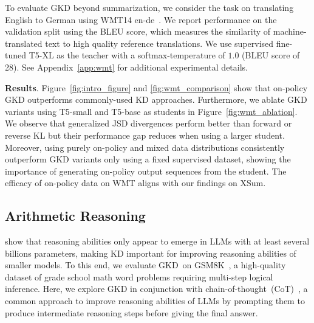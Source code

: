 \documentclass{article} %
\def\alg{GKD}
\newcommand{\nino}[1]{{\color{blue}[nino: #1]}}
\begin{document}
To evaluate GKD beyond summarization, we consider the task on translating English to  German using WMT14 en-de~\citep{bojar2014findings}. %
We report performance on the validation split using the BLEU score, which measures the similarity of machine-translated text to high quality reference translations. We use supervised fine-tuned T5-XL as the teacher with a softmax-temperature of $1.0$ (BLEU score of 28). See Appendix~\ref{app:wmt} for additional experimental details. 

\textbf{Results}. Figure~\ref{fig:intro_figure} and \ref{fig:wmt_comparison} show that on-policy GKD outperforms commonly-used KD approaches. Furthermore, we ablate GKD variants using T5-small and T5-base as students in  Figure~\ref{fig:wmt_ablation}. We observe that generalized JSD divergences perform better than forward or reverse KL but their performance gap reduces when using a larger student. Moreover, using purely on-policy and mixed data distributions consistently outperform GKD variants only using a fixed supervised dataset, showing the importance of generating on-policy output sequences from the student. The efficacy of on-policy data on WMT aligns with our findings on XSum. 









\vspace{-0.15cm}
\subsection{Arithmetic Reasoning}
\vspace{-0.1cm}

\citet{wei2022chain} show that reasoning abilities only appear to emerge in LLMs with at least several billions parameters, making KD important for improving reasoning abilities of smaller models. To this end, we evaluate \alg\ on GSM8K~\citep{cobbe2021training}, a high-quality dataset of grade school math word problems requiring multi-step logical inference. Here, we explore GKD in conjunction with chain-of-thought~(CoT)~\citep{wei2022chain}, a common approach to improve reasoning abilities of LLMs by prompting them to produce intermediate reasoning steps before giving the final answer.
\end{document}
